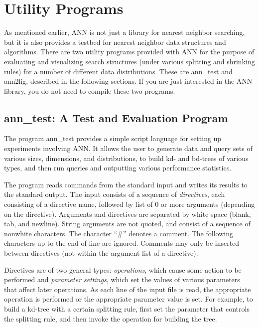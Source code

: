 \documentclass[11pt]{article}		%
\newcommand{\ANN}[0]{\textsf{ANN}}
\newcommand{\anntest}[0]{\textsf{ann\_test}}
\newcommand{\annfig}[0]{\textsf{ann2fig}}
\begin{document}
\newpage
\section{Utility Programs}

As mentioned earlier, {\ANN} is not just a library for nearest neighbor
searching, but it is also provides a testbed for nearest neighbor data
structures and algorithms.  There are two utility programs provided
with {\ANN} for the purpose of evaluating and visualizing search structures
(under various splitting and shrinking rules) for a number of different
data distributions.  These are {\anntest} and {\annfig},
described in the following sections.  If you are just interested in the
{\ANN} library, you do not need to compile these two programs.

\subsection{\anntest: A Test and Evaluation Program}\label{anntest.sec}

The program {\anntest} provides a simple script language for setting up
experiments involving {\ANN}.  It allows the user to generate data and
query sets of various sizes, dimensions, and distributions, to build kd-
and bd-trees of various types, and then run queries and outputting
various performance statistics.

The program reads commands from the standard input and writes its
results to the standard output.  The input consists of a sequence of
\emph{directives}, each consisting of a directive name, followed by list
of 0 or more arguments (depending on the directive).  Arguments and
directives are separated by white space (blank, tab, and newline).
String arguments are not quoted, and consist of a sequence of nonwhite
characters.  The character ``\#'' denotes a comment.  The following
characters up to the end of line are ignored.  Comments may only be
inserted between directives (not within the argument list of a
directive).

Directives are of two general types: \emph{operations}, which cause some
action to be performed and \emph{parameter settings}, which set the
values of various parameters that affect later operations.  As each line
of the input file is read, the appropriate operation is performed or the
appropriate parameter value is set.  For example, to build a kd-tree
with a certain splitting rule, first set the parameter that controls the
splitting rule, and then invoke the operation for building the tree.
\end{document}
